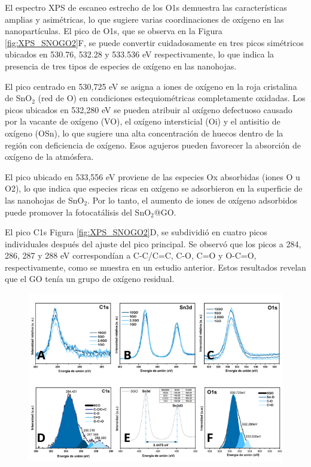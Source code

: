 \documentclass[12pt]{article}
\begin{document}
El espectro XPS de escaneo estrecho de los O1s demuestra las características amplias y asimétricas, lo que sugiere varias coordinaciones de oxígeno en las nanopartículas. El pico de O1s, que se observa en la Figura \ref{fig:XPS_SNOGO2}F, se puede convertir cuidadosamente en tres picos simétricos ubicados en 530.76, 532.28 y 533.536 eV respectivamente, lo que indica la presencia de tres tipos de especies de oxígeno en las nanohojas. \vspace{1em} %

El pico centrado en 530,725 eV se asigna a iones de oxígeno en la roja cristalina de SnO$\displaystyle _{2}$ (red de O) en condiciones estequiométricas completamente oxidadas. Los picos ubicados en 532,280 eV se pueden atribuir al oxígeno defectuoso causado por la vacante de oxígeno (VO), el oxígeno intersticial (Oi) y el antisitio de oxígeno (OSn), lo que sugiere una alta concentración de huecos dentro de la región con deficiencia de oxígeno. Esos agujeros pueden favorecer la absorción de oxígeno de la atmósfera.\vspace{1em} %

El pico ubicado en 533,556 eV proviene de las especies Ox absorbidas (iones O u O2), lo que indica que especies ricas en oxígeno se adsorbieron en la superficie de las nanohojas de SnO$\displaystyle _{2}$. Por lo tanto, el aumento de iones de oxígeno adsorbidos puede promover la fotocatálisis del SnO$\displaystyle _{2}$@GO.\vspace{1em} %

El pico C1s Figura \ref{fig:XPS_SNOGO2}D, se subdividió en cuatro picos individuales después del ajuste del pico principal. Se observó que los picos a 284, 286, 287 y 288 eV correspondían a C-C/C=C, C-O, C=O y O-C=O, respectivamente, como se muestra en un estudio anterior. Estos resultados revelan que el GO tenía un grupo de oxígeno residual.

\begin{figure}[H]
    	   \begin{center}
     	  	\includegraphics[width = 1\textwidth]{Imagenes/XPS_SNOGO2.png}
    	   \end{center} 
        \end{figure}
\end{document}
